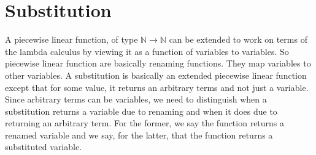 
\section{Substitution}\label{sec:substitution}

A piecewise linear function, of type $\mathbb{N} \to \mathbb{N}$ can be extended
to work on terms of the lambda calculus by viewing it as a function of variables
to variables. So piecewise linear function are basically renaming functions.
They map variables to other variables. A substitution is basically an extended
piecewise linear function except that for some value, it returns an arbitrary
terms and not just a variable. Since arbitrary terms can be variables, we need
to distinguish when a substitution returns a variable due to renaming and when
it does due to returning an arbitrary term. For the former, we say the function
returns a renamed variable and we say, for the latter, that the function returns
a substituted variable.





